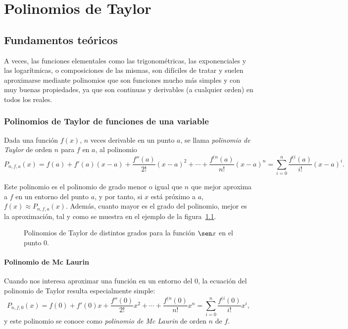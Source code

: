 \chapter{Polinomios de Taylor}

\section{Fundamentos teóricos}
A veces, las funciones elementales como las trigonométricas, las exponenciales y las logarítmicas, o composiciones de
las mismas, son difíciles de tratar y suelen aproximarse mediante polinomios que son funciones mucho más simples y con
muy buenas propiedades, ya que son continuas y derivables (a cualquier orden) en todos los reales.

\subsection{Polinomios de Taylor de funciones de una variable}
\begin{definicion}
Dada una función $f(x)$, $n$ veces derivable en un punto $a$, se llama \emph{polinomio de Taylor} de orden $n$ para $f$
en $a$, al polinomio
\[
P_{n,f,a}(x)=f(a)+f'(a)(x-a)+\frac{f''(a)}{2!}(x-a)^2+\cdots+\frac{f^{(n}(a)}{n!}(x-a)^n= \sum_{i=0}^{n}\frac{f^{(i}(a)}{i!}(x-a)^i.
\]
\end{definicion}

Este polinomio es el polinomio de grado menor o igual que $n$ que mejor aproxima a $f$ en un entorno del punto $a$, y
por tanto, si $x$ está próximo a $a$, $f(x)\approx P_{n,f,a}(x)$. 
Además, cuanto mayor es el grado del polinomio, mejor es la aproximación, tal y como se muestra en el ejemplo de la
figura~\ref{g:polinomios}.
\begin{figure}[h!]
\begin{center}
\scalebox{1}{}
\caption{Polinomios de Taylor de distintos grados para la función $\sen x$ en el punto 0.}
\label{g:polinomios}
\end{center}
\end{figure}

\subsubsection*{Polinomio de Mc Laurin}
Cuando nos interesa aproximar una función en un entorno del 0, la ecuación del polinomio de Taylor resulta especialmente simple:
\[
P_{n,f,0}(x)=f(0)+f'(0)x+\frac{f''(0)}{2!}x^2+\cdots+\frac{f^{(n}(0)}{n!}x^n= \sum_{i=0}^{n}\frac{f^{(i}(0)}{i!}x^i,
\]
y este polinomio se conoce como \emph{polinomio de Mc Laurin} de orden $n$ de $f$.

